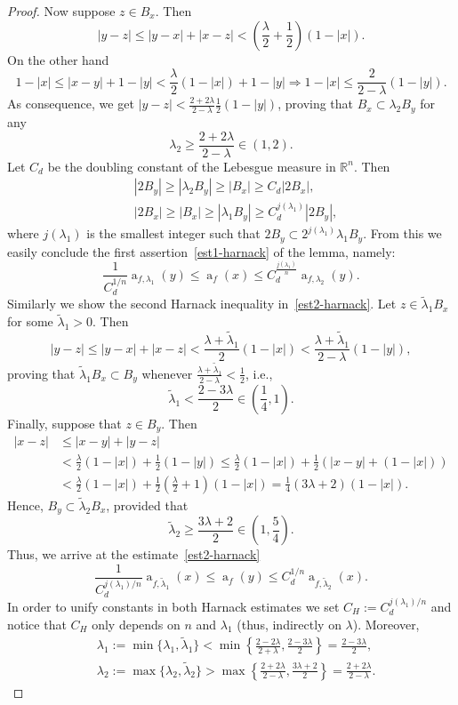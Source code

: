 \documentclass[11pt,a4paper,reqno]{amsart}
\theoremstyle{definition}
\renewcommand{\a}{\operatorname{a}}
\newcommand{\R}{\mathbb{R}}
\numberwithin{komcounter}{section}
\begin{document}
\begin{proof}
\noindent Now suppose $z\in B_x$. Then
 $$
  |y-z|\leq |y-x|+|x-z|< \left(\frac{\lambda}{2}+\frac{1}{2}\right) (1-|x|).
 $$ 
  On the other hand
  $$
   1-|x|\leq |x-y|+1-|y|< \frac{\lambda}{2}(1-|x|)+1-|y|\Rightarrow 1-|x|\leq \frac{2}{2-\lambda }(1-|y|).
  $$
  As consequence, we get $|y-z|<\frac{2+2\lambda}{2-\lambda}\frac{1}{2}(1-|y|)$, proving that $B_x\subset\lambda_2B_y$ for any
\begin{equation}\label{est-lambda-lem-harnack}
 \lambda_2\geq \frac{2+2\lambda}{2-\lambda}\in \left(1,2\right).
\end{equation}
 Let $C_d$ be the doubling constant of the Lebesgue measure in $\R^n$. Then
	\begin{align*}
		&|2B_y|\geq |\lambda_2B_y|\geq |B_x|\geq C_d|2B_x|,\\
		&|2B_x|\geq |B_x|\geq |\lambda_1 B_y|\geq C_d^{j(\lambda_1)}|2B_y|,
	\end{align*} 
	where $j(\lambda_1)$ is the smallest integer such that $2B_y\subset  2^{j(\lambda_1)}\lambda_1B_y$. From this we easily conclude the first assertion~\eqref{est1-harnack} of the lemma, namely:
	$$ 
	\frac{1}{C_d^{1/n}} \a_{f,\lambda_1}(y)\leq \a_f(x)\leq C_d^{\frac{j(\lambda_1)}{n}}\a_{f,\lambda_2}(y).
	$$
	Similarly we show the second Harnack inequality in~\eqref{est2-harnack}. Let $z\in \tilde{\lambda}_1B_x$ for some $\tilde{\lambda}_1>0$. Then
$$
|y-z|\leq |y-x|+|x-z|< \frac{\lambda+\tilde{\lambda}_1}{2} (1-|x|)<  \frac{\lambda+\tilde{\lambda}_1}{2-\lambda }(1-|y|),
$$
	 proving that $\tilde{\lambda}_1B_x\subset B_y$ whenever $\frac{\lambda+\tilde{\lambda}_1}{2-\lambda }<\frac{1}{2}$, i.e.,
	$$
	\tilde{\lambda}_1< \frac{2-3\lambda }{2}\in \left( \frac{1}{4},1\right).
	$$
	Finally, suppose that $z\in B_y$. Then
	\begin{align*}
		|x-z|&\leq |x-y|+|y-z| \\
		&< \frac{\lambda}{2}(1-|x|)+\frac{1}{2}(1-|y|)\leq 
		\frac{\lambda}{2}(1-|x|)+\frac{1}{2}( |x-y|+(1-|x|))
		\\ &< \frac{\lambda}{2}(1-|x|)+\frac{1}{2}\left(\frac{\lambda}{2}+1\right)(1-|x|)=\frac{1}{4}(3\lambda +2)(1-|x|).
	\end{align*}
	Hence, $B_y\subset \tilde{\lambda}_2B_x$, provided that
	$$\tilde{\lambda}_2\geq \frac{3\lambda +2}{2}\in \left( 1, \frac{5}{4}\right) .$$
	Thus, we arrive at the estimate~\eqref{est2-harnack}
	$$ 
	\frac{1}{C_d^{j(\lambda_1)/n}}\a_{f,\tilde{\lambda}_1}(x)\leq \a_f(y)\leq C_d^{1/n}\a_{f,\tilde{\lambda}_2}(x).
	$$
	In order to unify constants in both Harnack estimates we set $C_H:=C_d^{j(\lambda_1)/n}$ and notice that $C_H$ only depends on $n$ and $\lambda_1$ (thus, indirectly on $\lambda$). Moreover,
\begin{align}
 &\lambda_1:=\min \{ \lambda_1,\tilde{\lambda}_1\}<\min\left\{\frac{2-2\lambda}{2+\lambda}, \frac{2-3\lambda }{2}\right\}=\frac{2-3\lambda }{2}, \label{eq-lambda1}\\
 &\lambda_2:=\max\{ \lambda_2,\tilde{\lambda}_2\}>\max\left \{\frac{2+2\lambda}{2-\lambda}, \frac{3\lambda +2}{2}\right\}=\frac{2+2\lambda}{2-\lambda}. \label{eq-lambda2}
\end{align}
 \end{proof}
\end{document}
